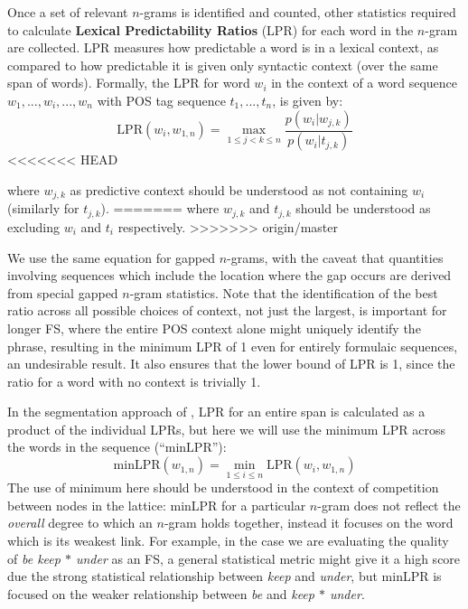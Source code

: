 \documentclass[11pt,letterpaper]{article}
\newcommand{\gap}{$*$\xspace}
\newcommand{\ex}[1]{\textit{#1}\xspace}
\newcommand{\termdef}[1]{\textbf{#1}\xspace}
\newcommand{\LPR}{\ensuremath{\text{LPR}}}
\newcommand{\minLPR}{\ensuremath{\text{minLPR}}}
\begin{document}
Once a set of relevant $n$-grams is identified and counted, other statistics required to calculate \termdef{Lexical Predictability Ratios} (LPR) for each word in the $n$-gram are collected. LPR measures how predictable a word is in a lexical context, as compared to how predictable it is given only syntactic context (over the same span of words). Formally, the LPR for word $w_i$ in the context of a word sequence $w_1,..., w_i, ..., w_{n}$ with POS tag sequence $t_1, ..., t_{n}$, is given by:
\begin{displaymath}
\LPR(w_i,w_{1,n}) = \max_{1 \leq j < k \leq n }{\frac{p(w_i|w_{j,k})}{p(w_i|t_{j,k})}}
\end{displaymath}
<<<<<<< HEAD

\noindent
where $w_{j,k}$ as predictive context should be understood as not containing $w_{i}$ (similarly for $t_{j,k}$). 
=======
where $w_{j,k}$ and $t_{j,k}$ should be understood as excluding $w_{i}$ and $t_{i}$ respectively. 
>>>>>>> origin/master

We use the same equation for gapped $n$-grams, with the caveat that quantities involving sequences which include the location where the gap occurs are derived from special gapped $n$-gram statistics. Note that the identification of the best ratio across all possible choices of context, not just the largest, is important for longer FS, where the entire POS context alone might uniquely identify the phrase, resulting in the minimum LPR of 1 even for entirely formulaic sequences, an undesirable result. 
It also ensures that the lower bound of LPR is 1, since the ratio for a word with no context is trivially 1.

In the segmentation approach of , LPR for an entire span is calculated as a product of the individual LPRs, but here we will use the minimum LPR across the words in the sequence (``\minLPR''):
\begin{displaymath}
\minLPR(w_{1,n}) = \min_{1 \leq i \leq n }{\LPR(w_i,w_{1,n})}
\end{displaymath}
The use of minimum here should be understood in the context of competition between nodes in the lattice: minLPR for a particular $n$-gram does not reflect the \emph{overall} degree to which an $n$-gram holds together, instead it focuses on the word which is its weakest link. For example, in the case we are evaluating the quality of \ex{be keep \gap under} as an FS, a general statistical metric might give it a high score due the strong statistical relationship between \ex{keep} and \ex{under}, but minLPR is focused on the weaker relationship between \ex{be} and \ex{keep \gap under}.
\end{document}
